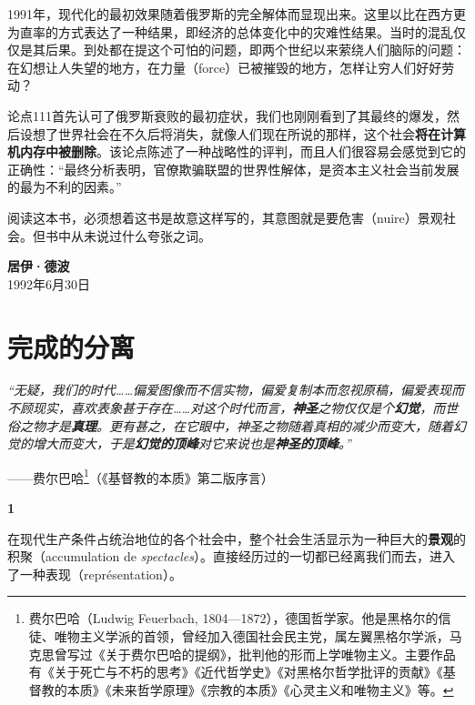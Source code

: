 \documentclass[fontset=fandol, a4paper, 12pt, openright]{ctexbook}
\makeatletter
\renewenvironment{quote}
  {\list{}{\rightmargin\leftmargin}%
   \item\relax\small\itshape\color{darkgray}}
  {\endlist}
\newcommand{\thesis}[1]{%
    \par\vspace{1.5em}%
    {\centering \textbf{\Large #1}\par}%
    \nobreak\vspace{0.5em}\nobreak
    \@afterindenttrue %
    \@afterheading    %
}
\makeatother
\begin{document}
1991年，现代化的最初效果随着俄罗斯的完全解体而显现出来。这里以比在西方更为直率的方式表达了一种结果，即经济的总体变化中的灾难性结果。当时的混乱仅仅是其后果。到处都在提这个可怕的问题，即两个世纪以来萦绕人们脑际的问题：在幻想让人失望的地方，在力量（force）已被摧毁的地方，怎样让穷人们好好劳动？

论点111首先认可了俄罗斯衰败的最初症状，我们也刚刚看到了其最终的爆发，然后设想了世界社会在不久后将消失，就像人们现在所说的那样，这个社会\textbf{将在计算机内存中被删除}。该论点陈述了一种战略性的评判，而且人们很容易会感觉到它的正确性：“最终分析表明，官僚欺骗联盟的世界性解体，是资本主义社会当前发展的最为不利的因素。”

阅读这本书，必须想着这书是故意这样写的，其意图就是要危害（nuire）景观社会。但书中从未说过什么夸张之词。

\begin{flushright}
\textbf{居伊·德波}\\
1992年6月30日
\end{flushright}

\tableofcontents

\mainmatter

\chapter{完成的分离}

\begin{quote}
“无疑，我们的时代……偏爱图像而不信实物，偏爱复制本而忽视原稿，偏爱表现而不顾现实，喜欢表象甚于存在……对这个时代而言，\textbf{神圣}之物仅仅是个\textbf{幻觉}，而世俗之物才是\textbf{真理}。更有甚之，在它眼中，神圣之物随着真相的减少而变大，随着幻觉的增大而变大，于是\textbf{幻觉的顶峰}对它来说也是\textbf{神圣的顶峰}。”

\begin{flushright}
——费尔巴哈\footnote{费尔巴哈（Ludwig Feuerbach, 1804—1872），德国哲学家。他是黑格尔的信徒、唯物主义学派的首领，曾经加入德国社会民主党，属左翼黑格尔学派，马克思曾写过《关于费尔巴哈的提纲》，批判他的形而上学唯物主义。主要作品有《关于死亡与不朽的思考》《近代哲学史》《对黑格尔哲学批评的贡献》《基督教的本质》《未来哲学原理》《宗教的本质》《心灵主义和唯物主义》等。}（《基督教的本质》第二版序言）
\end{flushright}
\end{quote}

\thesis{1}
在现代生产条件占统治地位的各个社会中，整个社会生活显示为一种巨大的\textbf{景观}的积聚（accumulation de \textit{spectacles}）。直接经历过的一切都已经离我们而去，进入了一种表现（représentation）。
\end{document}
